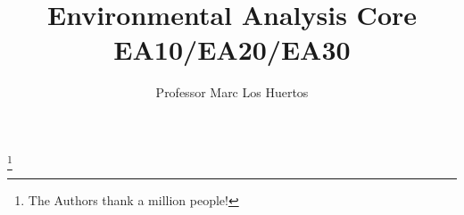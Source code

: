 \documentclass{tufte-book}\usepackage[]{graphicx}\usepackage[]{xcolor}
\begin{document}
\frontmatter


\title[EA Core]{Environmental Analysis Core EA10/EA20/EA30}
\author[Marc Los Huertos]{Professor Marc Los Huertos}

\thanks{The Authors thank a million people!}




\cleardoublepage
\vspace*{13.5pc}
\begin{center}
\end{center}
\cleardoublepage
\end{document}
